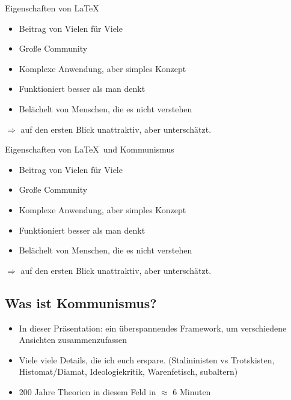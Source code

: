 \documentclass{beamer}
\begin{document}
\begin{frame}{Eigenschaften von \LaTeX}
    \begin{itemize}
        \item<2-> Beitrag von Vielen für Viele
        \item<3-> Große Community
        \item<4-> Komplexe Anwendung, aber simples Konzept
        \item<5-> Funktioniert besser als man denkt
        \item<6-> Belächelt von Menschen, die es nicht verstehen
    \end{itemize}

        $\Rightarrow$ auf den ersten Blick unattraktiv, aber unterschätzt.
\end{frame}

\begin{frame}{Eigenschaften von \LaTeX\ und Kommunismus}
    \begin{itemize}
        \item Beitrag von Vielen für Viele
        \item Große Community
        \item Komplexe Anwendung, aber simples Konzept
        \item Funktioniert besser als man denkt
        \item Belächelt von Menschen, die es nicht verstehen
    \end{itemize}
        $\Rightarrow$ auf den ersten Blick unattraktiv, aber unterschätzt.
\end{frame}

\begin{frame}
\section{Was  ist Kommunismus?}
\begin{itemize}
\item In dieser Präsentation: ein überspannendes Framework, um verschiedene Ansichten zusammenzufassen
\item Viele viele Details, die ich euch erspare. (Stalininisten vs Trotskisten, Histomat/Diamat, Ideologiekritik, Warenfetisch, subaltern)
\item 200 Jahre Theorien in diesem Feld in $\approx$ 6 Minuten
\end{itemize}
\end{frame}
\end{document}
